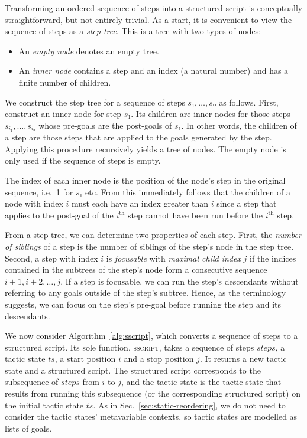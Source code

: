 \documentclass[sigplan,10pt,anonymous,review]{acmart}
\begin{document}
Transforming an ordered sequence of steps into a structured script is conceptually straightforward, but not entirely trivial.
As a start, it is convenient to view the sequence of steps as a \emph{step tree}.
This is a tree with two types of nodes:
\begin{itemize}
  \item An \emph{empty node} denotes an empty tree.
  \item An \emph{inner node} contains a step and an index (a natural number) and has a finite number of children.
\end{itemize}
We construct the step tree for a sequence of steps $s₁, \dots, sₙ$ as follows.
First, construct an inner node for step $s₁$.
Its children are inner nodes for those steps $s_{i₁}, \dots, s_{iₖ}$ whose pre-goals are the post-goals of $s₁$.
In other words, the children of a step are those steps that are applied to the goals generated by the step.
Applying this procedure recursively yields a tree of nodes.
The empty node is only used if the sequence of steps is empty.

The index of each inner node is the position of the node's step in the original sequence, i.e.\ 1 for $s₁$ etc.
From this immediately follows that the children of a node with index $i$ must each have an index greater than $i$ since a step that applies to the post-goal of the $i^{\text{th}}$ step cannot have been run before the $i^{\text{th}}$ step.

From a step tree, we can determine two properties of each step.
First, the \emph{number of siblings} of a step is the number of siblings of the step's node in the step tree.
Second, a step with index $i$ is \emph{focusable} with \emph{maximal child index} $j$ if the indices contained in the subtrees of the step's node form a consecutive sequence $i+1, i+2, \dots, j$.
If a step is focusable, we can run the step's descendants without referring to any goals outside of the step's subtree.
Hence, as the terminology suggests, we can focus on the step's pre-goal before running the step and its descendants.

We now consider Algorithm~\ref{alg:sscript}, which converts a sequence of steps to a structured script.
Its sole function, \textsc{sscript}, takes a sequence of steps $\mathit{steps}$, a tactic state $\mathit{ts}$, a start position $i$ and a stop position $j$.
It returns a new tactic state and a structured script.
The structured script corresponds to the subsequence of $\mathit{steps}$ from $i$ to $j$, and the tactic state is the tactic state that results from running this subsequence (or the corresponding structured script) on the initial tactic state $\mathit{ts}$.
As in Sec.~\ref{sec:static-reordering}, we do not need to consider the tactic states' metavariable contexts, so tactic states are modelled as lists of goals.
\end{document}
